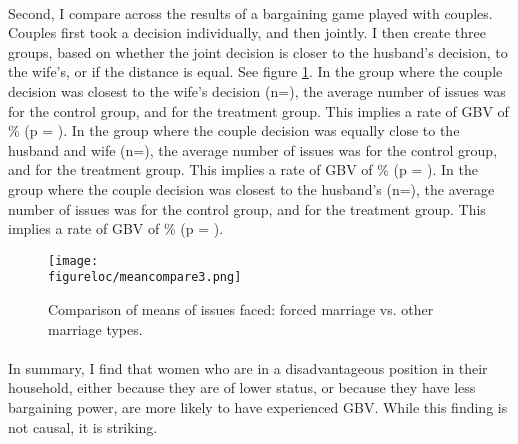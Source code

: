 \documentclass[11pt,a4paper]{scrartcl} %
\newcommand{\figureloc}{C:/Users/Koen/Dropbox/PhD/Papers/CongoGBV/Figures}
\newcommand{\bibloc}{C:/Users/Koen/Dropbox/Literatuur/Mendeley/Bibtex/CongoGBV}
\begin{document}
\paragraph{}
Second, I compare across the results of a bargaining game played with couples. Couples first took a decision individually, and then jointly. I then create three groups, based on whether the joint decision is closer to the husband's decision, to the wife's, or if the distance is equal. See figure \ref{fig:meancompare3}. In the group where the couple decision was closest to the wife's decision (n=), the average number of issues was  for the control group, and  for the treatment group. This implies a rate of GBV of \% (p = ). In the group where the couple decision was equally close to the husband and wife (n=), the average number of issues was  for the control group, and  for the treatment group. This implies a rate of GBV of \% (p = ). In the group where the couple decision was closest to the husband's (n=), the average number of issues was  for the control group, and  for the treatment group. This implies a rate of GBV of \% (p = ).

\begin{figure}
  \texttt{[image: \\figureloc/meancompare3.png]}
  \caption{Comparison of means of issues faced: forced marriage vs. other marriage types.}
  \label{fig:meancompare3}
\end{figure}


\paragraph{}
In summary, I find that women who are in a disadvantageous position in their household, either because they are of lower status, or because they have less bargaining power, are more likely to have experienced GBV. While this finding is not causal, it is striking.






\clearpage 


\end{document}
